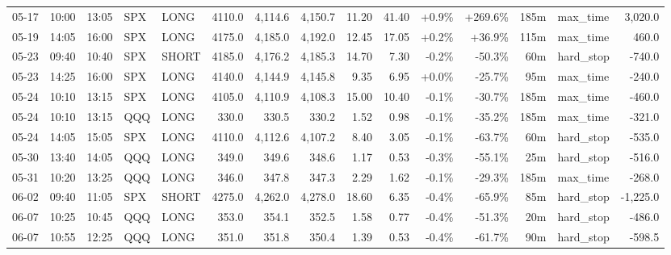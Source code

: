 \documentclass[11pt,a4paper,twoside]{article}
\begin{document}
\begin{landscape}
\begin{center}
\begin{longtable}{>{\color{txtmain}}l l l l l r r r r r r r r >{\color{txtmain}}l r}
05-17 & 10:00 & 13:05 & SPX & LONG & 4110.0 & 4,114.6 & 4,150.7 & 11.20 & 41.40 & \textcolor{wingreen}{+0.9\%} & \textcolor{wingreen}{+269.6\%} & 185m & max\_time & \textcolor{wingreen}{3,020.0} \\
05-19 & 14:05 & 16:00 & SPX & LONG & 4175.0 & 4,185.0 & 4,192.0 & 12.45 & 17.05 & \textcolor{wingreen}{+0.2\%} & \textcolor{wingreen}{+36.9\%} & 115m & max\_time & \textcolor{wingreen}{460.0} \\
05-23 & 09:40 & 10:40 & SPX & SHORT & 4185.0 & 4,176.2 & 4,185.3 & 14.70 & 7.30 & \textcolor{lossred}{-0.2\%} & \textcolor{lossred}{-50.3\%} & 60m & hard\_stop & \textcolor{lossred}{-740.0} \\
05-23 & 14:25 & 16:00 & SPX & LONG & 4140.0 & 4,144.9 & 4,145.8 & 9.35 & 6.95 & \textcolor{wingreen}{+0.0\%} & \textcolor{lossred}{-25.7\%} & 95m & max\_time & \textcolor{lossred}{-240.0} \\
05-24 & 10:10 & 13:15 & SPX & LONG & 4105.0 & 4,110.9 & 4,108.3 & 15.00 & 10.40 & \textcolor{lossred}{-0.1\%} & \textcolor{lossred}{-30.7\%} & 185m & max\_time & \textcolor{lossred}{-460.0} \\
05-24 & 10:10 & 13:15 & QQQ & LONG & 330.0 & 330.5 & 330.2 & 1.52 & 0.98 & \textcolor{lossred}{-0.1\%} & \textcolor{lossred}{-35.2\%} & 185m & max\_time & \textcolor{lossred}{-321.0} \\
05-24 & 14:05 & 15:05 & SPX & LONG & 4110.0 & 4,112.6 & 4,107.2 & 8.40 & 3.05 & \textcolor{lossred}{-0.1\%} & \textcolor{lossred}{-63.7\%} & 60m & hard\_stop & \textcolor{lossred}{-535.0} \\
05-30 & 13:40 & 14:05 & QQQ & LONG & 349.0 & 349.6 & 348.6 & 1.17 & 0.53 & \textcolor{lossred}{-0.3\%} & \textcolor{lossred}{-55.1\%} & 25m & hard\_stop & \textcolor{lossred}{-516.0} \\
05-31 & 10:20 & 13:25 & QQQ & LONG & 346.0 & 347.8 & 347.3 & 2.29 & 1.62 & \textcolor{lossred}{-0.1\%} & \textcolor{lossred}{-29.3\%} & 185m & max\_time & \textcolor{lossred}{-268.0} \\
06-02 & 09:40 & 11:05 & SPX & SHORT & 4275.0 & 4,262.0 & 4,278.0 & 18.60 & 6.35 & \textcolor{lossred}{-0.4\%} & \textcolor{lossred}{-65.9\%} & 85m & hard\_stop & \textcolor{lossred}{-1,225.0} \\
06-07 & 10:25 & 10:45 & QQQ & LONG & 353.0 & 354.1 & 352.5 & 1.58 & 0.77 & \textcolor{lossred}{-0.4\%} & \textcolor{lossred}{-51.3\%} & 20m & hard\_stop & \textcolor{lossred}{-486.0} \\
06-07 & 10:55 & 12:25 & QQQ & LONG & 351.0 & 351.8 & 350.4 & 1.39 & 0.53 & \textcolor{lossred}{-0.4\%} & \textcolor{lossred}{-61.7\%} & 90m & hard\_stop & \textcolor{lossred}{-598.5} \\

\end{longtable}
\end{center}
\end{landscape}
\end{document}
